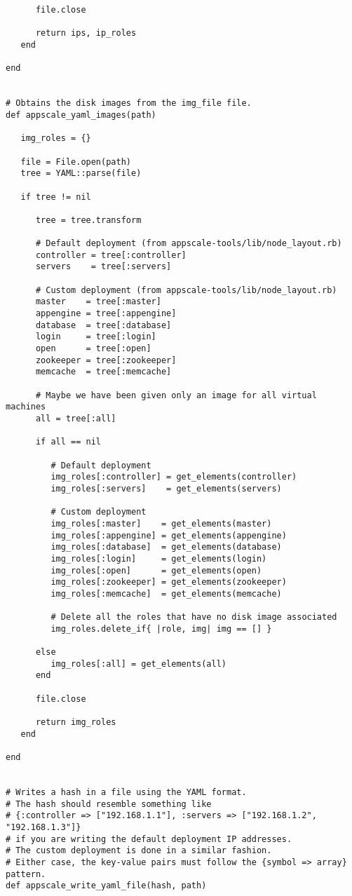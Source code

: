 \begin{lstlisting}
      file.close
      
      return ips, ip_roles
   end
   
end


# Obtains the disk images from the img_file file.
def appscale_yaml_images(path)

   img_roles = {}

   file = File.open(path)
   tree = YAML::parse(file)
   
   if tree != nil

      tree = tree.transform

      # Default deployment (from appscale-tools/lib/node_layout.rb)
      controller = tree[:controller]
      servers    = tree[:servers]
      
      # Custom deployment (from appscale-tools/lib/node_layout.rb)
      master    = tree[:master]
      appengine = tree[:appengine]
      database  = tree[:database]
      login     = tree[:login]
      open      = tree[:open]
      zookeeper = tree[:zookeeper]
      memcache  = tree[:memcache]
      
      # Maybe we have been given only an image for all virtual machines
      all = tree[:all]
      
      if all == nil

         # Default deployment
         img_roles[:controller] = get_elements(controller)
         img_roles[:servers]    = get_elements(servers)
         
         # Custom deployment
         img_roles[:master]    = get_elements(master)
         img_roles[:appengine] = get_elements(appengine)
         img_roles[:database]  = get_elements(database)
         img_roles[:login]     = get_elements(login)
         img_roles[:open]      = get_elements(open)
         img_roles[:zookeeper] = get_elements(zookeeper)
         img_roles[:memcache]  = get_elements(memcache)
         
         # Delete all the roles that have no disk image associated
         img_roles.delete_if{ |role, img| img == [] }
         
      else
         img_roles[:all] = get_elements(all)
      end
      
      file.close
      
      return img_roles
   end
   
end


# Writes a hash in a file using the YAML format.
# The hash should resemble something like
# {:controller => ["192.168.1.1"], :servers => ["192.168.1.2", "192.168.1.3"]}
# if you are writing the default deployment IP addresses.
# The custom deployment is done in a similar fashion.
# Either case, the key-value pairs must follow the {symbol => array} pattern.
def appscale_write_yaml_file(hash, path)


\end{lstlisting}

